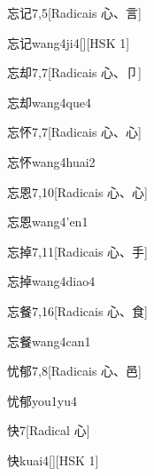 \begin{entry}{忘记}{7,5}[Radicais ⼼、⾔]
  \begin{phonetics}{忘记}{wang4ji4}[][HSK 1]
  \end{phonetics}
\end{entry}

\begin{entry}{忘却}{7,7}[Radicais ⼼、⼙]
  \begin{phonetics}{忘却}{wang4que4}
  \end{phonetics}
\end{entry}

\begin{entry}{忘怀}{7,7}[Radicais ⼼、⼼]
  \begin{phonetics}{忘怀}{wang4huai2}
  \end{phonetics}
\end{entry}

\begin{entry}{忘恩}{7,10}[Radicais ⼼、⼼]
  \begin{phonetics}{忘恩}{wang4'en1}
  \end{phonetics}
\end{entry}

\begin{entry}{忘掉}{7,11}[Radicais ⼼、⼿]
  \begin{phonetics}{忘掉}{wang4diao4}
  \end{phonetics}
\end{entry}

\begin{entry}{忘餐}{7,16}[Radicais ⼼、⾷]
  \begin{phonetics}{忘餐}{wang4can1}
  \end{phonetics}
\end{entry}

\begin{entry}{忧郁}{7,8}[Radicais ⼼、⾢]
  \begin{phonetics}{忧郁}{you1yu4}
  \end{phonetics}
\end{entry}

\begin{entry}{快}{7}[Radical ⼼]
  \begin{phonetics}{快}{kuai4}[][HSK 1]
  \end{phonetics}
\end{entry}

